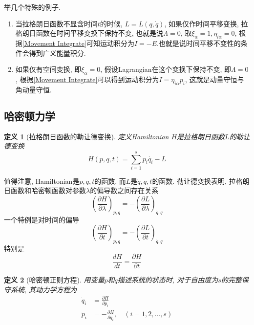 \documentclass[a4paper,11pt]{book}
\newtheorem{definition}{\hspace{2em}定义}[section]
\begin{document}
举几个特殊的例子.
\begin{enumerate}
  \item 当拉格朗日函数不显含时间$t$的时候, $L=L(q,\dot{q})$, 如果仅作时间平移变换, 拉格朗日函数在时间平移变换下保持不变, 也就是说$\Lambda=0$, 取$\xi_\alpha=1,\eta_{i\alpha}=0$, 根据\eqref{Movement Integrate}可知运动积分为$I=-E$.也就是说时间平移不变性的条件会得到广义能量积分.
  \item 如果仅有空间变换, 即$\xi_\alpha=0$, 假设Lagrangian在这个变换下保持不变, 即$\Lambda=0$, 根据\eqref{Movement Integrate}可以得到运动积分为$I=\eta_{i\alpha}p_i$, 这就是动量守恒与角动量守恒.
\end{enumerate}
\subsection{哈密顿力学}
\begin{definition}[拉格朗日函数的勒让德变换]
  定义Hamiltonian $H$是拉格朗日函数$L$的勒让德变换
  \begin{equation}\label{Legendra trans}
    H(p,q,t)=\sum_{i=1}^{s}p_i\dot{q_i}-L
  \end{equation}
\end{definition}
值得注意, Hamiltonian是$p,q,t$的函数, 而$L$是$\dot{q},q,t$的函数. 勒让德变换表明, 拉格朗日函数和哈密顿函数对参数$\lambda$的偏导数之间存在关系
\begin{equation}\label{H,Lambda}
  \left(\frac{\partial H}{\partial \lambda}\right)_{p,q}=-\left(\frac{\partial L}{\partial \lambda}\right)_{\dot{q},q}
\end{equation}
一个特例是对时间的偏导
\begin{equation}\label{H,L}
  \left(\frac{\partial H}{\partial t}\right)_{p,q}=-\left(\frac{\partial L}{\partial t}\right)_{\dot{q},q}
\end{equation}
特别是
\begin{equation}\label{H,t}
  \frac{dH}{dt}=\frac{\partial H}{\partial t}
\end{equation}
\begin{definition}[哈密顿正则方程]
  用变量$p$和$q$描述系统的状态时, 对于自由度为$s$的完整保守系统, 其动力学方程为
  \begin{equation}\label{Hamilton equ}
  \begin{split}
     \dot{q}_i&=\frac{\partial H}{\partial{p_i}} \\
     \dot{p}_i&=-\frac{\partial H}{\partial{q_i}},\quad(i=1,2,\dots,s)
  \end{split}
  \end{equation}
\end{definition}
\end{document}
